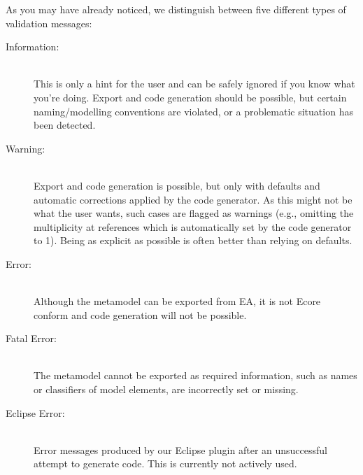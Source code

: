 As you may have already noticed, we distinguish between five different types of validation messages:
\begin{description}
  \item[Information:]~\\
  This is only a hint for the user and can be safely ignored if you know what you're doing.
  Export and code generation should be possible, but certain naming/modelling conventions are violated, or a problematic situation has been detected.
  
  \item[Warning:]~\\ Export and code generation is possible, but only with defaults and automatic corrections applied by the code generator.
  As this might not be what the user wants, such cases are flagged as warnings (e.g., omitting the multiplicity at references which is automatically set by the
  code generator to 1).
  Being as explicit as possible is often better than relying on defaults.
  
  \item[Error:]~\\ Although the metamodel can be exported from EA, it is not Ecore conform and code generation will not be possible.
 
  \item[Fatal Error:]~\\ The metamodel cannot be exported as required information, such as names or classifiers of model elements, are incorrectly set or
  missing.
  
  \item[Eclipse Error:]~\\ Error messages produced by our Eclipse plugin after an unsuccessful attempt to generate code.
  This is currently not actively used.

\end{description}

